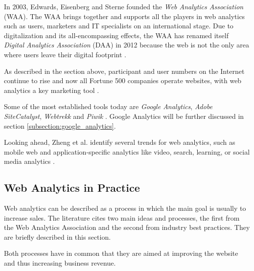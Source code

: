 
In 2003, Edwards, Eisenberg and Sterne founded the \textit{Web Analytics Association} (WAA).
The WAA brings together and supports all the players in web analytics such as users, marketers and IT specialists on an international stage.
Due to digitalization and its all-encompassing effects, the WAA has renamed itself \textit{Digital Analytics Association} (DAA) in 2012 because the web is not the only area where users leave their digital footprint \cite{2014Singal}.

As described in the section above, participant and user numbers on the Internet continue to rise and now all Fortune 500 companies operate websites, with web analytics a key marketing tool \cite{2019Kumar}.

Some of the most established tools today are \textit{Google Analytics}, \textit{Adobe SiteCatalyst}, \textit{Webtrekk} and \textit{Piwik} \cite{2020Heinemann}. %
Google Analytics will be further discussed in section \ref{subsection:google_analytics}.


Looking ahead, Zheng et al. identify several trends for web analytics, such as mobile web and application-specific analytics like video, search, learning, or social media analytics \cite{2015Zheng}.








\subsection{Web Analytics in Practice} %
\label{subsection:web_analytics_practice}

Web analytics can be described as a process in which the main goal is usually to increase sales.
The literature cites two main ideas and processes, the first from the Web Analytics Association and the second from industry best practices.
They are briefly described in this section.

Both processes have in common that they are aimed at improving the website and thus increasing business revenue.


